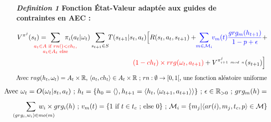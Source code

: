 \documentclass[francais,ROIA,Unicode,manuscript]{cedram}
\begin{document}
\begin{figure}[h!]
    \label{eq:single_value_function}
    \raggedright
    \textbf{\textit{Definition 1} \quad Fonction État-Valeur adaptée aux guides de contraintes en AEC :}

    \begin{scriptsize}
        \vspace{0.cm}
        \begin{gather*}
            V^{\pi^j}(s_t) = \hspace{-0.75cm}
            \sum_{\textcolor{red}{ \substack{a_{t} \in A \text{ if } rn() < ch_{t}, \\
                        a_{t} \in A_{t} \text{ else}}
                }}{\hspace{-0.7cm} \pi_i(a_{t} | \omega_t)}
            \sum_{s_{t+1} \in S}
            {\hspace{-0.1cm} T(s_{t+1} | s_t, a_{t})
            \Bigl[R(s_t,a_{t},s_{t+1}) + \hspace{-0.1cm}
            \textcolor{blue}{ \sum_{m \in \mathcal{M}_i}{ \hspace{-0.1cm} v_m(t) \frac{grg_m(h_{t+1})}{1 - p + \epsilon} } }
            + } \\
            {\hspace{6cm}\textcolor{red}{(1-ch_t) \times rrg(\omega_t,a_{t+1})} + V^{\pi^j_{i+1 \ mod \ n}}(s_{t+1})\Bigr]}
        \end{gather*}
        \vspace{0.cm}
        \textcolor{red}{\[\text{ \hspace{-0.3cm} Avec } rag(h_t, \omega_t) = A_{t} \times \mathbb{R} \text{, } \langle a_t, ch_{t} \rangle \in A_{t} \times \mathbb{R} \text{ ; } rn: \emptyset \to [0,1[ \text{, une fonction aléatoire uniforme}\]}
        \vspace{-0.2cm}
        \textcolor{blue}{
            \begin{gather*}
                \hspace{-0.65cm}
                \text{Avec } \omega_t = O(\omega_t | s_t, a_t) \text{ ; } h_t = \{h_0 = \langle \rangle, h_{t+1} = \langle h_t, \langle \omega_{t+1}, a_{t+1} \rangle \rangle \} \text{ ; } \epsilon \in \mathbb{R}_{>0} \text{ ; } grg_m(h) =
            \end{gather*}
        }
        \vspace{-0.2cm}
        \textcolor{blue}{
            \begin{gather*}
                \hspace{-0.5cm} \sum_{\hspace{0.3cm}(grg_i,w_i) \in mo(m)}{\hspace{-0.9cm} w_i \times grg_i(h)}
                \text{ ; } v_m(t) = \{ 1 \text{ if } t \in t_c \text{ ; else } 0 \} \text{ ; } \mathcal{M}_i = \{m_j | \langle ar(i),m_j,t_c,p \rangle \in \mathcal{M}\}
            \end{gather*}
        }
        \vspace{0.cm}
    \end{scriptsize}

\end{figure}
\end{document}
